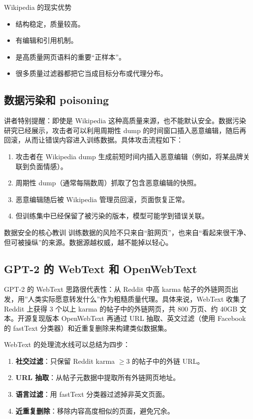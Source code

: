 \documentclass[a4paper]{article}
\begin{document}
\begin{knowledgebox}{Wikipedia 的现实优势}
\begin{itemize}
    \item 结构稳定，质量较高。
    \item 有编辑和引用机制。
    \item 是高质量网页语料的重要“正样本”。
    \item 很多质量过滤器都把它当成目标分布或代理分布。
\end{itemize}
\end{knowledgebox}

\subsection{数据污染和 poisoning}

讲者特别提醒：即使是 Wikipedia 这种高质量来源，也不能默认安全。数据污染研究已经展示，攻击者可以利用周期性 dump 的时间窗口插入恶意编辑，随后再回滚，从而让错误内容进入训练数据。具体攻击流程如下：

\begin{enumerate}
    \item 攻击者在 Wikipedia dump 生成前短时间内插入恶意编辑（例如，将某品牌关联到负面情感）。
    \item 周期性 dump（通常每隔数周）抓取了包含恶意编辑的快照。
    \item 恶意编辑随后被 Wikipedia 管理员回滚，页面恢复正常。
    \item 但训练集中已经保留了被污染的版本，模型可能学到错误关联。
\end{enumerate}

\begin{warningbox}{数据安全的核心教训}
训练数据的风险不只来自“脏网页”，也来自“看起来很干净、但可被操纵”的来源。数据源越权威，越不能掉以轻心。
\end{warningbox}

\subsection{GPT-2 的 WebText 和 OpenWebText}

GPT-2 的 WebText 思路很代表性：从 Reddit 中高 karma 帖子的外链网页出发，用”人类实际愿意转发什么”作为粗糙质量代理。具体来说，WebText 收集了 Reddit 上获得 3 个以上 karma 的帖子中的外链网页，共 800 万页、约 40GB 文本。开源复现版本 OpenWebText 再通过 URL 抽取、英文过滤（使用 Facebook 的 fastText 分类器）和近重复删除来构建类似数据集。

WebText 的处理流水线可以总结为四步：
\begin{enumerate}
    \item \textbf{社交过滤}：只保留 Reddit karma $\geq 3$ 的帖子中的外链 URL。
    \item \textbf{URL 抽取}：从帖子元数据中提取所有外链网页地址。
    \item \textbf{语言过滤}：用 fastText 分类器过滤掉非英文页面。
    \item \textbf{近重复删除}：移除内容高度相似的页面，避免冗余。
\end{enumerate}
\end{document}
